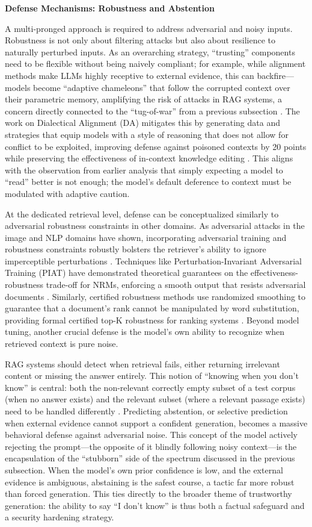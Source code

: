\documentclass[11pt]{article}
\begin{document}
\textbf{Defense Mechanisms: Robustness and Abstention}

A multi-pronged approach is required to address adversarial and noisy inputs. Robustness is not only about filtering attacks but also about resilience to naturally perturbed inputs. As an overarching strategy, ``trusting'' components need to be flexible without being naively compliant; for example, while alignment methods make LLMs highly receptive to external evidence, this can backfire---models become ``adaptive chameleons'' that follow the corrupted context over their parametric memory, amplifying the risk of attacks in RAG systems, a concern directly connected to the ``tug-of-war'' from a previous subsection \cite{ref180}. The work on Dialectical Alignment (DA) mitigates this by generating data and strategies that equip models with a style of reasoning that does not allow for conflict to be exploited, improving defense against poisoned contexts by 20 points while preserving the effectiveness of in-context knowledge editing \cite{ref180}. This aligns with the observation from earlier analysis that simply expecting a model to ``read'' better is not enough; the model's default deference to context must be modulated with adaptive caution.

At the dedicated retrieval level, defense can be conceptualized similarly to adversarial robustness constraints in other domains. As adversarial attacks in the image and NLP domains have shown, incorporating adversarial training and robustness constraints robustly bolsters the retriever's ability to ignore imperceptible perturbations \cite{ref262}. Techniques like Perturbation-Invariant Adversarial Training (PIAT) have demonstrated theoretical guarantees on the effectiveness-robustness trade-off for NRMs, enforcing a smooth output that resists adversarial documents \cite{ref263}. Similarly, certified robustness methods use randomized smoothing to guarantee that a document's rank cannot be manipulated by word substitution, providing formal certified top-K robustness for ranking systems \cite{ref264}. Beyond model tuning, another crucial defense is the model's own ability to recognize when retrieved context is pure noise.

RAG systems should detect when retrieval fails, either returning irrelevant content or missing the answer entirely. This notion of ``knowing when you don't know'' is central: both the non-relevant correctly empty subset of a test corpus (when no answer exists) and the relevant subset (where a relevant passage exists) need to be handled differently \cite{ref265}. Predicting abstention, or selective prediction when external evidence cannot support a confident generation, becomes a massive behavioral defense against adversarial noise. This concept of the model actively rejecting the prompt---the opposite of it blindly following noisy context---is the encapsulation of the ``stubborn'' side of the spectrum discussed in the previous subsection. When the model's own prior confidence is low, and the external evidence is ambiguous, abstaining is the safest course, a tactic far more robust than forced generation. This ties directly to the broader theme of trustworthy generation: the ability to say ``I don't know'' is thus both a factual safeguard and a security hardening strategy.
\end{document}
